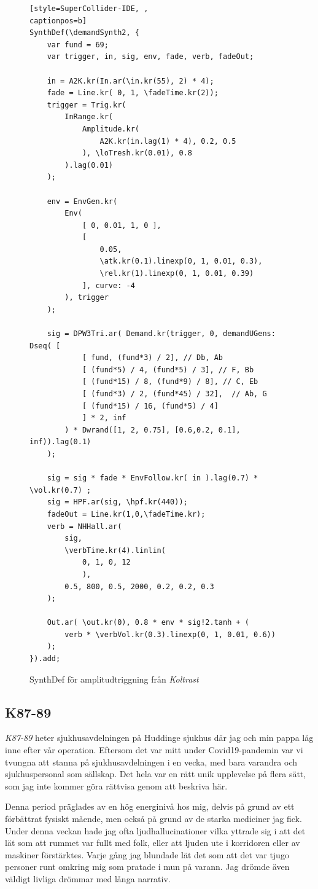 \documentclass{article}
\renewcommand{\baselinestretch}{1.5}
\begin{document}
\renewcommand{\baselinestretch}{1}
\begin{figure}
\begin{lstlisting}[style=SuperCollider-IDE, ,
captionpos=b]
SynthDef(\demandSynth2, {
	var fund = 69;
	var trigger, in, sig, env, fade, verb, fadeOut;

	in = A2K.kr(In.ar(\in.kr(55), 2) * 4);
	fade = Line.kr( 0, 1, \fadeTime.kr(2));
	trigger = Trig.kr(
		InRange.kr( 
			Amplitude.kr(
				A2K.kr(in.lag(1) * 4), 0.2, 0.5
			), \loTresh.kr(0.01), 0.8 
		).lag(0.01)
	);

	env = EnvGen.kr(
		Env( 
			[ 0, 0.01, 1, 0 ],
			[
				0.05,
				\atk.kr(0.1).linexp(0, 1, 0.01, 0.3),
				\rel.kr(1).linexp(0, 1, 0.01, 0.39) 
			], curve: -4
		), trigger
	);

	sig = DPW3Tri.ar( Demand.kr(trigger, 0, demandUGens: Dseq( [ 
			[ fund, (fund*3) / 2], // Db, Ab
			[ (fund*5) / 4, (fund*5) / 3], // F, Bb
			[ (fund*15) / 8, (fund*9) / 8], // C, Eb
			[ (fund*3) / 2, (fund*45) / 32],  // Ab, G
			[ (fund*15) / 16, (fund*5) / 4]
			] * 2, inf
		) * Dwrand([1, 2, 0.75], [0.6,0.2, 0.1], inf)).lag(0.1)
	);

	sig = sig * fade * EnvFollow.kr( in ).lag(0.7) * \vol.kr(0.7) ;
	sig = HPF.ar(sig, \hpf.kr(440));
	fadeOut = Line.kr(1,0,\fadeTime.kr);
	verb = NHHall.ar(
		sig, 
		\verbTime.kr(4).linlin(
			0, 1, 0, 12
			), 
		0.5, 800, 0.5, 2000, 0.2, 0.2, 0.3
	);

	Out.ar( \out.kr(0), 0.8 * env * sig!2.tanh + ( 
		verb * \verbVol.kr(0.3).linexp(0, 1, 0.01, 0.6))
	);  
}).add;
\end{lstlisting}
\caption{SynthDef för amplitudtriggning från \emph{Koltrast}}
\end{figure}
\renewcommand{\baselinestretch}{1.5}


\subsection{K87-89}\nocite{K87-89}
\emph{K87-89} heter sjukhusavdelningen på Huddinge sjukhus där jag och min pappa låg inne efter vår operation. 
Eftersom det var mitt under Covid19-pandemin var vi tvungna att stanna på sjukhusavdelningen i en vecka, med bara
varandra och sjukhuspersonal som sällskap. Det hela var en rätt unik upplevelse på flera sätt, som jag inte
kommer göra rättvisa genom att beskriva här. 

Denna period präglades av en hög energinivå hos mig, delvis på grund av ett förbättrat fysiskt mående, men
också på grund av de starka mediciner jag fick. Under denna veckan hade jag ofta ljudhallucinationer vilka
yttrade sig i att det lät som att rummet var fullt med folk, eller att ljuden ute i korridoren eller av
maskiner förstärktes. Varje gång jag blundade lät det som att det var tjugo personer runt omkring mig som
pratade i mun på varann. Jag drömde även väldigt livliga drömmar med långa narrativ. 
\end{document}

